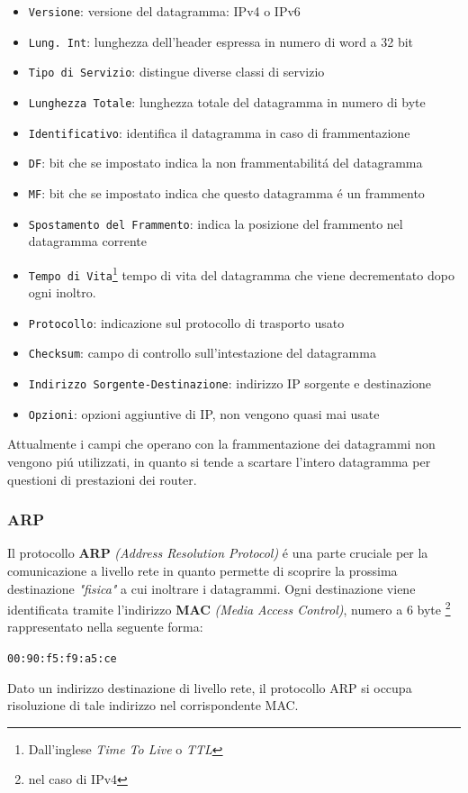 \documentclass[12pt]{article}
\def\code#1{\texttt{#1}}
\begin{document}
\begin{itemize}[noitemsep]
	\item \code{Versione}: versione del datagramma: IPv4 o IPv6
	\item \code{Lung. Int}: lunghezza dell'header espressa in numero di word a 32 bit
	\item \code{Tipo di Servizio}: distingue diverse classi di servizio
	\item \code{Lunghezza Totale}: lunghezza totale del datagramma in numero di byte
	\item \code{Identificativo}: identifica il datagramma in caso di frammentazione
	\item \code{DF}: bit che se impostato indica la non frammentabilit\'a del datagramma
	\item \code{MF}: bit che se impostato indica che questo datagramma \'e un frammento
	\item \code{Spostamento del Frammento}: indica la posizione del frammento nel datagramma corrente
	\item \code{Tempo di Vita}\footnote{Dall'inglese \textit{Time To Live} o \textit{TTL}} tempo di vita del datagramma 
	      che viene decrementato dopo ogni inoltro.
	\item \code{Protocollo}: indicazione sul protocollo di trasporto usato
	\item \code{Checksum}: campo di controllo sull'intestazione del datagramma
	\item \code{Indirizzo Sorgente-Destinazione}: indirizzo IP sorgente e destinazione
	\item \code{Opzioni}: opzioni aggiuntive di IP, non vengono quasi mai usate
\end{itemize}

Attualmente i campi che operano con la frammentazione dei datagrammi non vengono pi\'u utilizzati, in quanto si tende a scartare l'intero datagramma per questioni di prestazioni dei router.

\clearpage
\subsubsection{ARP}\label{spazio-indirizzamento-in-ip-arp}
Il protocollo \textbf{ARP} \textit{(Address Resolution Protocol)} \'e una parte cruciale per la comunicazione a livello 
rete in quanto permette di scoprire la prossima destinazione \textit{"fisica"} a cui inoltrare i datagrammi. Ogni 
destinazione viene identificata tramite l'indirizzo \textbf{MAC} \textit{(Media Access Control)}, numero a 6 byte
\footnote{nel caso di IPv4} rappresentato nella seguente forma:
\begin{center}
	\code{00:90:f5:f9:a5:ce}
\end{center}
Dato un indirizzo destinazione di livello rete, il protocollo ARP si occupa risoluzione di tale indirizzo nel 
corrispondente MAC. 
\end{document}
